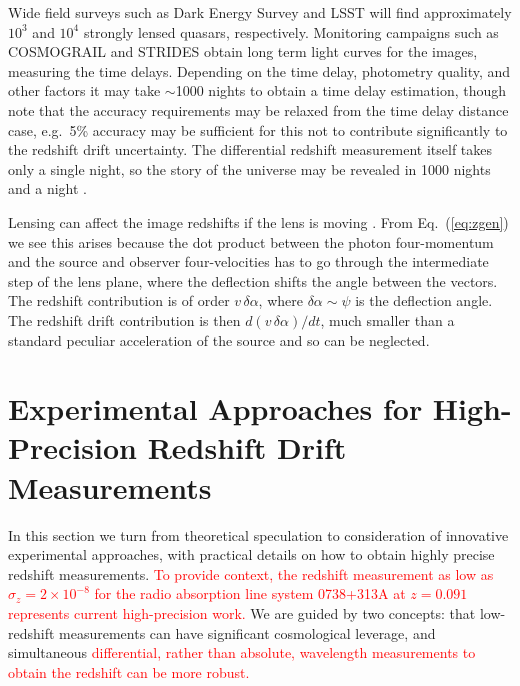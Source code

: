\documentclass[preprint2, 10pt]{aastex}
\begin{document}
Wide field surveys such as Dark Energy Survey and LSST will find 
approximately $10^3$ and $10^4$ strongly lensed quasars, respectively.  
Monitoring 
campaigns such as COSMOGRAIL \citep{cosmograil} and STRIDES \citep{strides} 
obtain long term light curves for the images, measuring the time 
delays.  Depending on the time delay, photometry quality, and other 
factors it may take $\sim$1000 nights to obtain a time delay 
estimation, though note that the accuracy requirements may be relaxed 
from the time delay distance case, e.g.\ 5\% accuracy may be sufficient 
for this not to contribute significantly to the redshift drift uncertainty. 
The differential redshift measurement itself takes only a single night, 
so the story of the universe may be revealed in 1000 nights and a night 
\citep{1001}. 


Lensing can affect the image redshifts if the lens is moving 
\citep{mitrofanov,birkgull}.  From 
Eq.~(\ref{eq:zgen}) we see this arises because the dot product between 
the photon four-momentum and the source and observer four-velocities 
has to go through the intermediate step of the lens plane, where the 
deflection shifts the angle between the vectors.  The redshift contribution 
is of order $v\,\delta\alpha$, where $\delta\alpha\sim\psi$ is the 
deflection angle.  The redshift drift contribution is then 
$d(v\,\delta\alpha)/dt$, much smaller than a standard peculiar 
acceleration of the source and so can be neglected. 



\section{Experimental Approaches for High-Precision Redshift Drift Measurements} \label{sec:tech} 

In this section we turn from theoretical speculation to consideration of 
innovative experimental approaches, with practical details on how to 
obtain highly precise redshift measurements. 
\textcolor{red}{
To provide context, the redshift measurement as low as 
$\sigma_z=2\times 10^{-8}$ for the radio absorption line system 0738+313A at $z=0.091$
\citep{2012ApJ...761L..26D} represents current high-precision 
work.}
We are guided by two concepts: 
that low-redshift measurements can have significant cosmological leverage, 
and simultaneous
\textcolor{red}
{differential, rather than absolute, wavelength measurements
to obtain the redshift can be more robust.}
\end{document}

